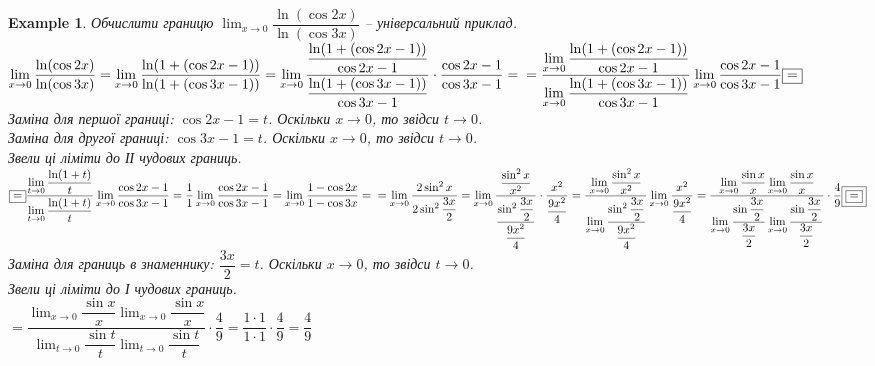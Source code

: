 \documentclass[a4paper, 14pt]{article}
\theoremstyle{theoremdd}
\theoremstyle{theoremdd}
\theoremstyle{theoremdd}
\theoremstyle{theoremdd}
\newtheorem{example}[theorem]{Example}
\theoremstyle{theoremdd}
\theoremstyle{theoremdd}
\theoremstyle{theoremdd}
\theoremstyle{theoremdd}
\begin{document}
\begin{example}
Обчислити границю $\displaystyle\lim_{x \to 0} \dfrac{\ln (\cos 2x)}{\ln (\cos 3x)}$ -- універсальний приклад.\\
$\displaystyle\lim_{x \to 0} \dfrac{\ln (\cos 2x)}{\ln (\cos 3x)} = \lim_{x \to 0} \dfrac{\ln (1 + (\cos 2x - 1))}{\ln (1 + (\cos 3x - 1))} = \lim_{x \to 0} \dfrac{\dfrac{\ln (1 + (\cos 2x - 1))}{\cos 2x - 1}}{\dfrac{\ln (1 + (\cos 3x - 1))}{\cos 3x - 1}} \cdot \dfrac{\cos 2x -1}{\cos 3x - 1} = \\ = \dfrac{\displaystyle \lim_{x \to 0} \dfrac{\ln (1 + (\cos 2x - 1))}{\cos 2x - 1}}{\displaystyle \lim_{x \to 0} \dfrac{\ln (1 + (\cos 3x - 1))}{\cos 3x - 1}} \lim_{x \to 0} \dfrac{\cos 2x -1}{\cos 3x - 1} \boxed{=}$\\
Заміна для першої границі: $\cos 2x - 1 = t$. Оскільки $x \to 0$, то звідси $t \to 0$.\\
Заміна для другої границі: $\cos 3x - 1 = t$. Оскільки $x \to 0$, то звідси $t \to 0$.\\
Звели ці ліміти до ІІ чудових границь.\\
$\boxed{=} \displaystyle \dfrac{\displaystyle\lim_{t \to 0} \dfrac{\ln (1+t)}{t}}{\displaystyle \lim_{t \to 0} \dfrac{\ln(1+t)}{t}} \lim_{x \to 0} \dfrac{\cos 2x -1}{\cos 3x - 1} = \dfrac{1}{1} \lim_{x \to 0} \dfrac{\cos 2x -1}{\cos 3x - 1} = \lim_{x \to 0} \dfrac{1 - \cos 2x}{1 - \cos 3x} = \\ = \lim_{x \to 0} \dfrac{2 \sin^2 x}{2 \sin^2 \dfrac{3x}{2}} = \lim_{x \to 0} \dfrac{\dfrac{\sin^2 x}{x^2}}{\dfrac{\sin^2 \dfrac{3x}{2}}{\dfrac{9x^2}{4}}} \cdot \dfrac{x^2}{\dfrac{9x^2}{4}} = \dfrac{\displaystyle \lim_{x \to 0} \dfrac{\sin^2 x}{x^2}}{\displaystyle \lim_{x \to 0} \dfrac{\sin^2 \dfrac{3x}{2}}{\dfrac{9x^2}{4}}} \displaystyle\lim_{x \to 0} \dfrac{x^2}{\dfrac{9x^2}{4}} = \dfrac{\displaystyle \lim_{x \to 0} \dfrac{\sin x}{x} \lim_{x \to 0} \dfrac{\sin x}{x}}{\displaystyle \lim_{x \to 0} \dfrac{\sin \dfrac{3x}{2}}{\dfrac{3x}{2}} \lim_{x \to 0} \dfrac{\sin \dfrac{3x}{2}}{\dfrac{3x}{2}}} \cdot \dfrac{4}{9} \boxed{\boxed{=}}$\\
Заміна для границь в знаменнику: $\dfrac{3x}{2} = t$. Оскільки $x \to 0$, то звідси $t \to 0$.\\
Звели ці ліміти до І чудових границь.\\
$\boxed{\boxed{=}} \dfrac{\displaystyle \lim_{x \to 0} \dfrac{\sin x}{x} \lim_{x \to 0} \dfrac{\sin x}{x}}{\displaystyle \lim_{t \to 0} \dfrac{\sin t}{t} \lim_{t \to 0} \dfrac{\sin t}{t}} \cdot \dfrac{4}{9} = \dfrac{1 \cdot 1}{1 \cdot 1} \cdot \dfrac{4}{9} = \dfrac{4}{9}$
\end{example}
\end{document}
